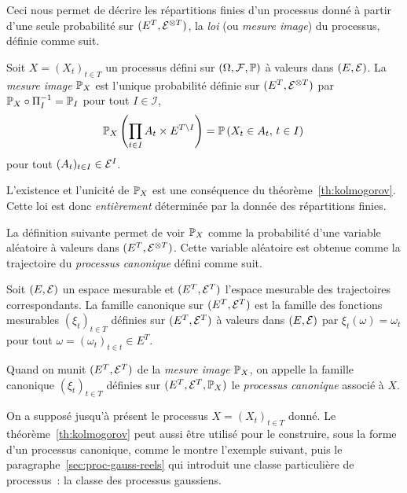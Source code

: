 Ceci nous permet de d\'ecrire les r\'epartitions finies d'un processus
donn\'e \`a partir d'une seule probabilit\'e sur $(E^T,\mathcal{E}^{\otimes T})$, la
\emph{loi} (ou \emph{mesure image}) du processus, d\'efinie comme suit.

\begin{definition}
\label{def:loi_proc}
Soit $X=(X_t)_{t \in T}$ un processus d\'efini sur  $(\Omega,\mathcal{F},\mathbb{P})$ \`a valeurs dans $(E,\mathcal{E})$. La \emph{mesure image}
$\mathbb{P}_X$ est l'unique probabilit\'e d\'efinie sur $(E^T,\mathcal{E}^{\otimes T})$ par $\mathbb{P}_X\circ\Pi_I^{-1}=\mathbb{P}_I$ pour tout $I\in\mathcal{I}$, \ie
$$
\mathbb{P}_X\left(\prod_{t\in I}A_{t} \times E^{T\setminus I}\right) = \mathbb{P}\left(X_{t}\in A_t,\,t\in I\right)\,
$$
pour tout $(A_t)_{t\in I}\in\mathcal{E}^I$.
\end{definition}
L'existence et l'unicit\'e de  $\mathbb{P}_X$ est une cons\'equence du  th\'eor\`eme~\ref{th:kolmogorov}.
Cette loi est donc {\em enti\`erement} d\'etermin\'ee par la donn\'ee des
r\'epartitions finies.

La d\'efinition suivante permet de voir $\mathbb{P}_X$ comme la probabilit\'e
d'une variable al\'eatoire \`a valeurs dans
$(E^T,\mathcal{E}^{\otimes T})$. Cette variable al\'eatoire est obtenue comme la
trajectoire du \emph{processus canonique} d\'efini comme suit.

\begin{definition}
\label{def:proc_canon}
Soit  $(E,\mathcal{E})$ un espace mesurable et $(E^T,\mathcal{E}^T)$ l'espace mesurable des trajectoires correspondants.
La famille canonique sur $(E^T,\mathcal{E}^T)$ est la famille des fonctions
mesurables  $(\xi_t)_{t\in T}$ d\'efinies sur
$(E^T,\mathcal{E}^T)$  \`a valeurs dans  $(E,\mathcal{E})$ par $\xi_t(\omega)=\omega_t$ pour tout $\omega=(\omega_t)_{t\in t}\in E^T$.

Quand on munit $(E^T,\mathcal{E}^T)$ de la \emph{mesure image} $\mathbb{P}_X$,
on appelle la famille canonique  $(\xi_t)_{t\in T}$ d\'efinies sur $(E^T,\mathcal{E}^T,\mathbb{P}_X)$ le \emph{processus canonique} associ\'e
\`a $X$.
\end{definition}

On a suppos\'e jusqu'\`a pr\'esent le processus $X=(X_t)_{t\in T}$ donn\'e.
Le th\'eor\`eme~\ref{th:kolmogorov} peut aussi \^{e}tre utilis\'e pour le
construire, sous la forme d'un processus canonique, comme le montre
l'exemple suivant, puis le paragraphe~\ref{sec:proc-gauss-reels} qui
introduit une classe particuli\`ere de processus~: la classe des
processus gaussiens.

